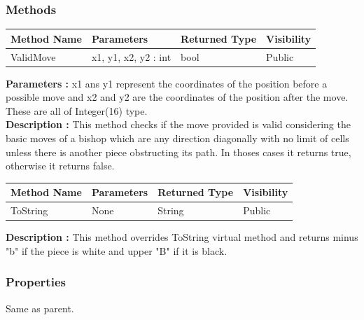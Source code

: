 \documentclass[12pt]{article}
\begin{document}
\subsubsection{Methods}

\begin{table}[H]
    \begin{tabular}{|l|l|l|l|}
    \hline
    \rowcolor[HTML]{EFEFEF} 
    \cellcolor[HTML]{EFEFEF}\textbf{Method Name} & \textbf{Parameters}  & \textbf{Returned Type} & \textbf{Visibility} \\ \hline
    ValidMove                          & x1, y1, x2, y2 : int & bool                   & Public              \\ \hline
    \end{tabular}
\end{table}

\textbf{Parameters :} x1 ans y1 represent the coordinates of the position before a possible move
and x2 and y2 are the coordinates of the position after the move. These are all of Integer(16) type.
\\
\textbf{Description :} This method checks if the move provided is valid considering the basic moves of a bishop which
are any direction diagonally with no limit of cells unless there is another piece obstructing its path. In thoses 
cases it returns true, otherwise it returns false. 

\begin{table}[H]
    \begin{tabular}{|l|l|l|l|}
    \hline
    \rowcolor[HTML]{EFEFEF} 
    \cellcolor[HTML]{EFEFEF}\textbf{Method Name} & \textbf{Parameters}  & \textbf{Returned Type} & \textbf{Visibility} \\ \hline
    ToString                                   & None                 & String                   & Public              \\ \hline
    \end{tabular}
\end{table}

\textbf{Description :} This method overrides ToString virtual
method and returns minus "b" if the piece is white and upper "B"
if it is black.

\subsubsection{Properties}

Same as parent.

\newpage
\end{document}
